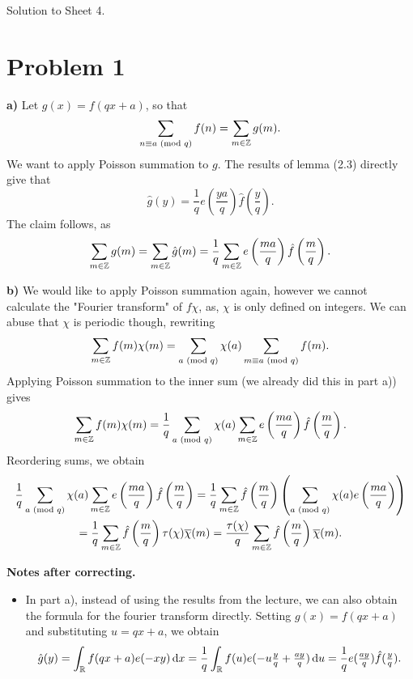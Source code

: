 \documentclass[a4paper,11pt]{article}
\author{Max von Consbruch}
\begin{document}
\begin{center}
    \huge{Solution to Sheet 4.}
\end{center}

\section*{Problem 1} %
\textbf{a)} Let $g(x) = f(qx + a)$, so that
\[
    \sum_{n \equiv a \text{ (mod $q$)}} f(n) = \sum_{m \in \mathbb{Z}} g(m).
\]
We want to apply Poisson summation to $g$. The results of lemma (2.3) directly
give that 
$$\hat g(y) = \frac 1q e\left( \frac{ya}q \right) \hat f\left(\frac yq \right).$$
The claim follows, as
$$ \sum_{m \in \mathbb{Z}} g(m) = \sum_{m \in \mathbb{Z}} \hat g(m) = \frac 1q \sum_{m \in \mathbb{Z}} 
    e\left( \frac{ma}q \right) \hat f\left(\frac mq \right).$$

\textbf{b)} We would like to apply Poisson summation again, however we cannot 
calculate the "Fourier transform" of $f\chi$, as, $\chi$ is only defined 
on integers. We can abuse that $\chi$ is periodic though, rewriting
\[
    \sum_{m \in \mathbb{Z}} f(m) \chi(m) = \sum_{a \text{ (mod $q$)}} \chi(a) \sum_{m \equiv a \text{ (mod $q$)}}
    f(m).
\]
Applying Poisson summation to the inner sum (we already did this in part
a)) gives
\[
    \sum_{m \in \mathbb{Z}} f(m) \chi(m) = \frac 1q \sum_{a \text{ (mod $q$)}} \chi(a) \sum_{m \in \mathbb{Z}} 
    e\left( \frac{ma}q \right) \hat f\left(\frac mq \right).
\]
Reordering sums, we obtain
\begin{multline*}
     \frac 1q \sum_{a \text{ (mod $q$)}} \chi(a) \sum_{m \in \mathbb{Z}} 
     e\left( \frac{ma}q \right) \hat f\left(\frac mq \right) = \frac 1q \sum_{m
         \in \mathbb{Z}} \hat f\left(\frac mq \right) \left( \sum_{a \text{ (mod $q$)}}
             \chi(a) e\left(\frac{ma}q \right) \right) \\ =  \frac 1q \sum_{m
         \in \mathbb{Z}} \hat f\left(\frac mq \right) \tau(\chi) \overline \chi(m) =
         \frac {\tau(\chi)}q \sum_{m \in \mathbb{Z}} \hat f\left(\frac mq \right)
         \overline \chi(m). 
\end{multline*}

\textbf{Notes after correcting.}
\begin{itemize}
    \item In part a), instead of using the results from the lecture, we can
        also obtain the formula for the fourier transform directly.
        Setting $g(x) = f(qx + a)$ and substituting $u = qx + a$, we obtain
        \[
            \hat g ( y ) = 
            \int_{\mathbb{R}} f(qx+a) e(-xy) \mathrm{\,d} x = 
            \frac 1q \int_{\mathbb{R}} f(u) e(-u\tfrac yq + \tfrac{ay}q)
            \mathrm{\,d} u = \frac 1q e(\tfrac {ay}q) \hat f(\tfrac yq).
        \]
\end{itemize}
\end{document}
